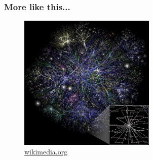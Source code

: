    \begin{frame}
    \frametitle{More like this...}
      \begin{figure}
    \includegraphics[height=6.5cm]{./imgs/map.jpg}
  \caption{\color{blue}\href{https://upload.wikimedia.org/wikipedia/commons/thumb/d/d2/Internet_map_1024.jpg/768px-Internet_map_1024.jpg}{wikimedia.org}}
  \label{fig:map}
      \end{figure}
  \end{frame}

